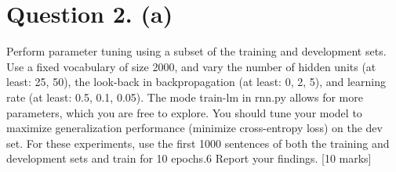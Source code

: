 \documentclass{article}
\begin{document}




\section{Question 2. (a)}
Perform parameter tuning using a subset of the training and development sets. Use a fixed vocabulary of size 2000, and vary the number of hidden units (at least: 25, 50), the look-back in backpropagation (at least: 0, 2, 5), and learning rate (at least: 0.5, 0.1, 0.05). The mode train-lm in rnn.py allows for more parameters, which you are free to explore. You should tune your model to maximize generalization performance (minimize cross-entropy loss) on the dev set. For these experiments, use the first 1000 sentences of both the training and development sets and train for 10 epochs.6 Report your findings. [10 marks]
\end{document}
